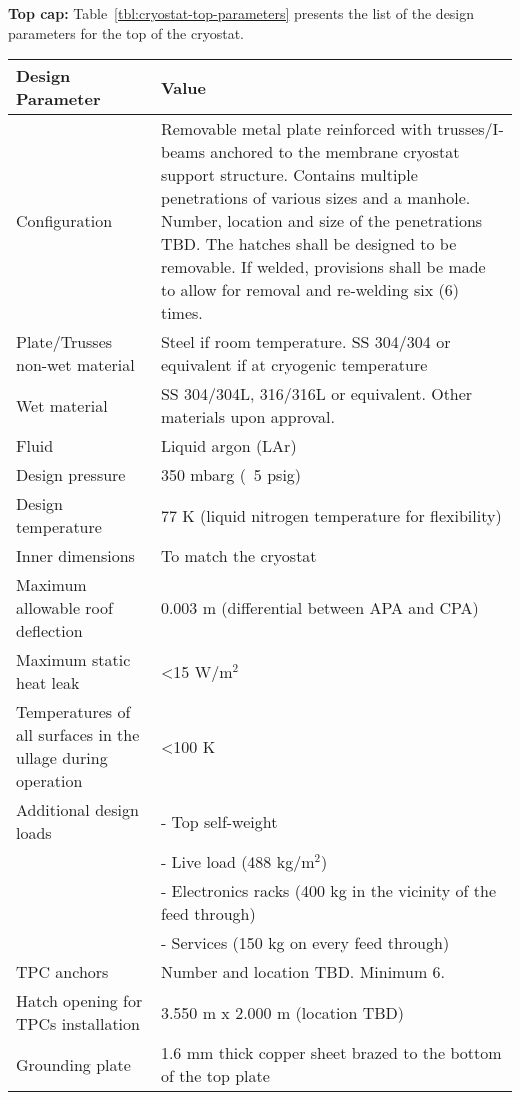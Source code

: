 \noindent \textbf{Top cap:}
%
Table~\ref{tbl:cryostat-top-parameters} presents the list of the design parameters for the top of the cryostat.
%
\begin{table}[htpb]
\centering
\begin{tabular}{|p{}|p{}|} %
\hline
 \textbf{Design Parameter} & \textbf{Value} \\ \hline
 Configuration &  Removable metal plate reinforced with trusses/I-beams anchored to the membrane cryostat support structure. Contains multiple penetrations of various sizes and a manhole. Number, location and size of the penetrations TBD. The hatches shall be designed to be removable. If welded, provisions shall be made to allow for removal and re-welding six (6) times.\\ \hline
Plate/Trusses non-wet material  &  Steel if room temperature.
SS 304/304 or equivalent if at cryogenic temperature
\\ \hline
Wet material  & SS 304/304L, 316/316L or equivalent. 
Other materials upon approval.
 \\ \hline
 Fluid & Liquid argon (LAr) \\ \hline
Design pressure  & 350 mbarg (~5 psig) \\ \hline
Design temperature  & 77 K (liquid nitrogen temperature for flexibility) \\ \hline
Inner dimensions  & To match the cryostat \\ \hline
Maximum allowable roof deflection  & 0.003 m (differential between APA and CPA) \\ \hline
Maximum static heat leak  & \textless 15 W/m$^2$  \\ \hline
 Temperatures of all surfaces in the ullage during operation & \textless 100 K \\ \hline
Additional design loads  &  -	Top self-weight \\
 & -	Live load (488 kg/m$^2$)\\
& -	Electronics racks (400 kg in the vicinity of the feed through)\\
& -	Services (150 kg on every feed through)
\\ \hline
TPC anchors  & %
Number and location TBD. Minimum 6.
 \\ \hline
 Hatch opening for TPCs installation &  3.550 m x 2.000 m (location TBD)\\ \hline %
Grounding plate  &  1.6 mm thick copper sheet brazed to the bottom of the top plate\\ \hline

\end{tabular}
\end{table}
